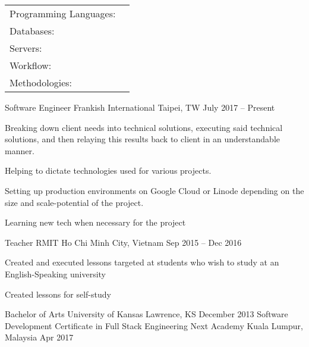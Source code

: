 \documentclass[]{awesome-cv}
\begin{document}
\begin{cventries}
	\cventry
	{}
	{\def\arraystretch{1.15}{\begin{tabular}{ l l }
		Programming Languages:  & {\skill{ JavaScript \& Node.js, Ruby \& Ruby on Rails, React}} \\
		Databases:  & {\skill{ SQL - MySQL \& PostgreSQL, NoSQL - MongoDB \& Redis, Back-Up/Restore/Replication}} \\
		Servers:  & {\skill{ Google Cloud, AWS, Debian}} \\
		Workflow:  & {\skill{ Visual Studio Code, JIRA, Trello}} \\
		Methodologies:  & {\skill{ Waterfall, Agile/Scrum, Kanban}} \\
		\end{tabular}}}
	{}
	{}
	{}
\end{cventries}


\vspace{-7mm}
\begin{cventries}
	\cventry
	{Software Engineer}
	{Frankish International}
	{Taipei, TW}
	{July 2017 – Present}
	{\begin{cvitems}
		\item {Breaking down client needs into technical solutions, executing said technical solutions, and then relaying this results back to client in an understandable manner.}
		\item {Helping to dictate technologies used for various projects.}
		\item {Setting up production environments on Google Cloud or Linode depending on the size and scale-potential of the project.}
		\item {Learning new tech when necessary for the project}
		\end{cvitems}}
	\cventry
	{Teacher}
	{RMIT}
	{Ho Chi Minh City, Vietnam}
	{Sep 2015 – Dec 2016}
	{\begin{cvitems}
		\item {Created and executed lessons targeted at students who wish to study at an English-Speaking university}
		\item {Created lessons for self-study}
		\end{cvitems}}
\end{cventries}
\begin{cventries}
	\cventry
	{Bachelor of Arts}
	{University of Kansas}
	{Lawrence, KS}
	{December 2013}
	{}
	\cventry
	{Software Development Certificate in Full Stack Engineering}
	{Next Academy}
	{Kuala Lumpur, Malaysia}
	{Apr 2017}
	{}
\end{cventries}

\vspace{-2mm}

\ 
\end{document}
